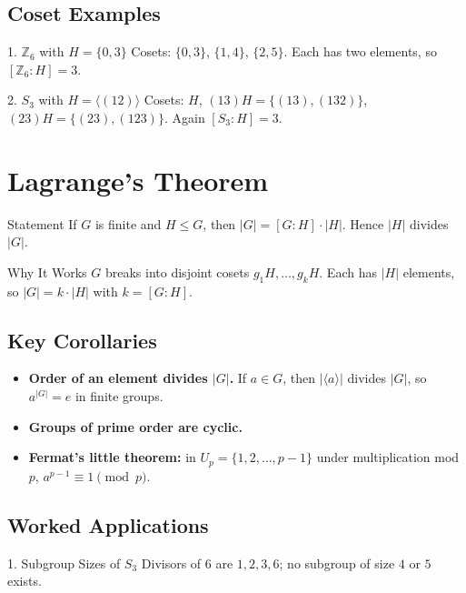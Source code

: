 \documentclass[12pt]{article}
\begin{document}
\subsection*{Coset Examples}
\begin{examplebox}{1. $\mathbb{Z}_6$ with $H=\{0,3\}$}
Cosets: $\{0,3\}$, $\{1,4\}$, $\{2,5\}$. Each has two elements, so $[\mathbb{Z}_6:H]=3$.
\end{examplebox}

\begin{examplebox}{2. $S_3$ with $H=\langle(12)\rangle$}
Cosets: $H$, $(13)H=\{(13),(132)\}$, $(23)H=\{(23),(123)\}$. Again $[S_3:H]=3$.
\end{examplebox}

\section*{Lagrange's Theorem}
\begin{definitionbox}{Statement}
If $G$ is finite and $H\leq G$, then $|G|=[G:H]\cdot|H|$. Hence $|H|$ divides $|G|$.
\end{definitionbox}

\begin{examplebox}{Why It Works}
$G$ breaks into disjoint cosets $g_1H,\dots,g_kH$. Each has $|H|$ elements, so $|G|=k\cdot|H|$ with $k=[G:H]$.
\end{examplebox}

\subsection*{Key Corollaries}
\begin{itemize}
  \item \textbf{Order of an element divides $|G|$.} If $a\in G$, then $|\langle a\rangle|$ divides $|G|$, so $a^{|G|}=e$ in finite groups.
  \item \textbf{Groups of prime order are cyclic.}
  \item \textbf{Fermat's little theorem:} in $U_p=\{1,2,\dots,p-1\}$ under multiplication mod $p$, $a^{p-1}\equiv1\pmod p$.
\end{itemize}

\subsection*{Worked Applications}
\begin{examplebox}{1. Subgroup Sizes of $S_3$}
Divisors of $6$ are $1,2,3,6$; no subgroup of size $4$ or $5$ exists.
\end{examplebox}
\end{document}
